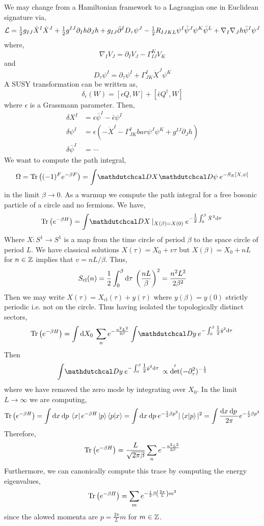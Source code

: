 \documentclass[12pt]{extarticle}
\begin{document}
We may change from a Hamiltonian framework to a Lagrangian one in Euclidean signature via,
\[ \mathcal{L} = \tfrac{1}{2} g_{IJ} \dot{X}^I \dot{X}^J + \tfrac{1}{2} g^{IJ} \partial_I h \partial_J h + g_{IJ} \bar{\partial}^I D_\tau \psi^J - \tfrac{1}{2} R_{IJKL} \psi^I \bar{\psi}^J \psi^K \bar{\psi}^L + \nabla_I \nabla_J h \bar{\psi}^I \psi^J \]
where,
\[ \nabla_I V_J = \partial_I V_J - \Gamma^K_{IJ} V_K \]
and
\[ D_\tau \psi^I = \partial_\tau \psi^I + \Gamma^I_{JK} \dot{X}^J \psi^K \]
A SUSY transformation can be written as,
\[ \delta_\epsilon(W) = [\epsilon Q, W] + [\bar{\epsilon} Q^\dagger, W] \]
where $\epsilon$ is a Grassmann parameter. Then,
\begin{align*}
\delta X^I & = \epsilon \bar{\psi}^I - \bar{\epsilon} \psi^I
\\
\delta \psi^I & = \epsilon \left( - \dot{X}^I - \Gamma^I_{JK} bar{\psi}^J \psi^K + g^{IJ} \partial_J h \right) 
\\
\delta \bar{\psi}^I & = \cdots 
\end{align*}
We want to compute the path integral,
\[ \Omega = \Tr{(-1)^F e^{-\beta F}} = \int \pathd{X} \pathd{\psi} e^{-S_E[X, \psi]} \]
in the limit $\beta \to 0$. As a warmup we compute the path integral for a free bosonic particle of a circle and no fermions. We have,
\[ \Tr{e^{-\beta H}} = \int \pathd{X}|_{X(\beta) = X(0)} \: e^{-\tfrac{1}{2} \int_0^\beta \dot{X}^2 \d{\tau} } \]
Where $X : S^1 \to S^1$ is a map from the time circle of period $\beta$ to the space circle of period $L$. We have classical solutions $X(\tau) = X_0 + v \tau$ but $X(\beta) = X_0 + n L$ for $n \in \mathbb{Z}$ implies that $v = nL/\beta$. Thus,
\[ S_{\text{cl}}(n) = \frac{1}{2} \int_0^\beta \mathrm{d}\tau \: \left( \frac{n L}{\beta} \right)^2 = \frac{n^2 L^2}{2\beta^2} \]
Then we may write $X(\tau) = X_{\text{cl}}(\tau) + y(\tau)$ where $y(\beta) = y(0)$ strictly periodic i.e. not on the circle. Thus having isolated the topologically distinct sectors,
\[ \Tr{e^{-\beta H}} = \int\d{X_0} \sum_{n} e^{- \frac{n^2 L^2}{2 \beta}} \int \pathd{y} e^{- \int_0^\beta \tfrac{1}{2} \dot{y}^2 \d{\tau}} \]
Then 
\[  \int \pathd{y} e^{- \int_0^\beta \tfrac{1}{2} \dot{y}^2 \d{\tau}} \propto \det'(-\partial_\tau^2)^{-\frac{1}{2}} \]
where we have removed the zero mode by integrating over $X_0$. In the limit $L \to \infty$ we are computing,
\begin{align*}
\mathrm{Tr}\left( e^{-\beta H} \right) = \int \mathrm{d}x \: \mathrm{d}p \: \left< x \right| e^{-\beta H} \left| p \right> \left< p | x \right> = \int \mathrm{d}x \: \mathrm{d}p \: e^{-\frac{1}{2} \beta p^2} |\left< x | p \right>|^2 = \int \frac{\mathrm{d}x \:\mathrm{d}p \:}{2 \pi} e^{-\frac{1}{2} \beta p^2} 
\end{align*}
Therefore,
\[ \mathrm{Tr}\left( e^{-\beta H} \right) = \frac{L}{\sqrt{2 \pi \beta}} \sum_n e^{-\frac{n^2 L^2}{2 \beta}} \]
Furthermore, we can canonically compute this trace by computing the energy eigenvalues,
\[ \mathrm{Tr}\left( e^{-\beta H} \right) = \sum_m e^{-\frac{1}{2} \beta \left( \frac{2 \pi}{L} \right) m^2} \]
since the alowed momenta are $p = \frac{2 \pi}{L} m$ for $m \in \mathbb{Z}$. 
\end{document}

